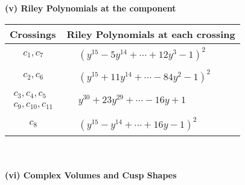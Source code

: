 \documentclass[1p]{elsarticle_modified}
\theoremstyle{definition}
\begin{document}
\newpage\renewcommand{\arraystretch}{1}
\flushleft \textbf{(v) Riley Polynomials at the component}\newline \\
\begin{tabular}{m{50pt}|m{274pt}}
Crossings & \hspace{64pt}Riley Polynomials at each crossing \\
\hline $$\begin{aligned}c_{1},c_{7}\end{aligned}$$&$\begin{aligned}
&(y^{15}-5 y^{14}+\cdots+12 y^3-1)^{2}
\end{aligned}$\\
\hline $$\begin{aligned}c_{2},c_{6}\end{aligned}$$&$\begin{aligned}
&(y^{15}+11 y^{14}+\cdots-84 y^2-1)^{2}
\end{aligned}$\\
\hline $$\begin{aligned}c_{3},c_{4},c_{5}\\c_{9},c_{10},c_{11}\end{aligned}$$&$\begin{aligned}
&y^{30}+23 y^{29}+\cdots-16 y+1
\end{aligned}$\\
\hline $$\begin{aligned}c_{8}\end{aligned}$$&$\begin{aligned}
&(y^{15}- y^{14}+\cdots+16 y-1)^{2}
\end{aligned}$\\
\hline
\end{tabular}\\~\\
\newpage\flushleft \textbf{(vi) Complex Volumes and Cusp Shapes}
\end{document}
